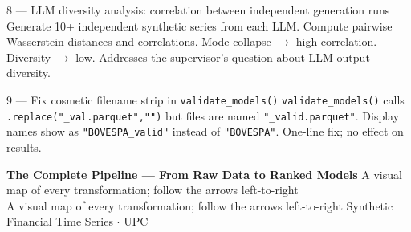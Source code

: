 \documentclass[10pt]{article}
\newcommand{\pagehead}[2]{%
  \begin{tcolorbox}[enhanced,arc=0pt,outer arc=0pt,boxrule=0pt,
    colback=Navy,colframe=Navy,
    top=5pt,bottom=5pt,left=8pt,right=8pt,
    before skip=0pt,after skip=10pt]
  {\color{white}\large\bfseries #1}%
  \ifx\relax#2\relax\else\\[1pt]{\color{blue!30!white}\small #2}\fi
  \hfill{\color{blue!20!white}\footnotesize Synthetic Financial Time Series $\cdot$ UPC}
  \end{tcolorbox}}
\begin{document}
%
  {8 --- LLM diversity analysis: correlation between independent generation runs}%
  {Generate 10+ independent synthetic series from each LLM. Compute pairwise Wasserstein distances and correlations. Mode collapse $\to$ high correlation. Diversity $\to$ low. Addresses the supervisor's question about LLM output diversity.}

%
  {9 --- Fix cosmetic filename strip in \texttt{validate\_models()}}%
  {\texttt{validate\_models()} calls \texttt{.replace("\_val.parquet","")} but files are named \texttt{"\_valid.parquet"}. Display names show as \texttt{"BOVESPA\_valid"} instead of \texttt{"BOVESPA"}. One-line fix; no effect on results.}


\clearpage


\pagehead{The Complete Pipeline --- From Raw Data to Ranked Models}
         {A visual map of every transformation; follow the arrows left-to-right}
\end{document}
